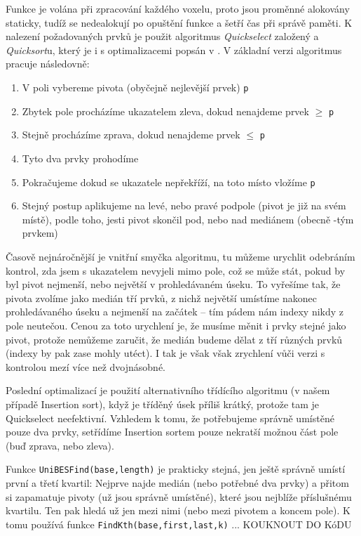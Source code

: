         Funkce je volána při zpracování každého voxelu, proto jsou proměnné alokovány staticky, tudíž se nedealokují po opuštění funkce a šetří čas při správě paměti. K nalezení požadovaných prvků je použit algoritmus \emph{Quickselect} založený a \emph{Quicksort}u, který je i s optimalizacemi popsán v \cite{Numerical Recipes}. V základní verzi algoritmus pracuje následovně:
        \begin{enumerate}
          \item V poli vybereme pivota (obyčejně nejlevější prvek) {\tt p}
          \item Zbytek pole procházíme ukazatelem zleva, dokud nenajdeme prvek $\ge$ {\tt p}
          \item Stejně procházíme zprava, dokud nenajdeme prvek $\le$ {\tt p}
          \item Tyto dva prvky prohodíme
          \item Pokračujeme dokud se ukazatele nepřekříží, na toto místo vložíme {\tt p}
          \item Stejný postup aplikujeme na levé, nebo pravé podpole (pivot je již na svém místě), podle toho, jesti pivot skončil pod, nebo nad mediánem (obecně \kk-tým prvkem)
        \end{enumerate}
        
        Časově nejnáročnější je vnitřní smyčka algoritmu, tu můžeme urychlit odebráním kontrol, zda jsem s ukazatelem nevyjeli mimo pole, což se může stát, pokud by byl pivot nejmenší, nebo největší v prohledávaném úseku. To vyřešíme tak, že pivota zvolíme jako medián tří prvků, z nichž největší umístíme nakonec prohledávaného úseku a nejmenší na začátek -- tím pádem nám indexy nikdy z pole neutečou. Cenou za toto urychlení je, že musíme měnit i prvky stejné jako pivot, protože nemůžeme zaručit, že medián budeme dělat z tří různých prvků (indexy by pak zase mohly utéct). I tak je však však zrychlení vůči verzi s kontrolou mezí více než dvojnásobné. 
        
        Poslední optimalizací je použití alternativního třídícího algoritmu (v našem případě Insertion sort), když je tříděný úsek příliš krátký, protože tam je Quickselect neefektivní. Vzhledem k tomu, že potřebujeme správně umístěné pouze dva prvky, setřídíme Insertion sortem pouze nekratší možnou část pole (buď zprava, nebo zleva).
        
        Funkce {\tt UniBESFind(base,length)} je prakticky stejná, jen ještě správně umístí první a třetí kvartil: Nejprve najde medián (nebo potřebné dva prvky) a přitom si zapamatuje pivoty (už jsou správně umístěné), které jsou nejblíže příslušnému kvartilu. Ten pak hledá už jen mezi nimi (nebo mezi pivotem a koncem pole). K tomu používá funkce {\tt FindKth(base,first,last,k)} ... KOUKNOUT DO KóDU
        
        
        
        
        





















